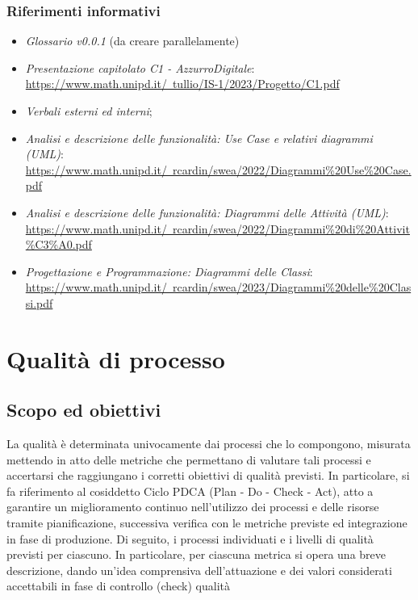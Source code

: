 \documentclass[10pt, a4paper]{article}
\begin{document}
    \subsubsection{Riferimenti informativi}
    
    \begin{itemize}
    \item \textit{Glossario v0.0.1} (da creare parallelamente) 
    \item \textit{Presentazione capitolato C1 - AzzurroDigitale}:\\
    \href{https://www.math.unipd.it/~tullio/IS-1/2023/Progetto/C1.pdf}{https://www.math.unipd.it/~tullio/IS-1/2023/Progetto/C1.pdf}
    \item \textit{Verbali esterni ed interni};
    \item \textit{Analisi e descrizione delle funzionalità: Use Case e relativi diagrammi (UML)}:\\
    \href{https://www.math.unipd.it/~rcardin/swea/2022/Diagrammi%20Use%20Case.pdf}{https://www.math.unipd.it/~rcardin/swea/2022/Diagrammi\%20Use\%20Case.pdf}
    \item \textit{Analisi e descrizione delle funzionalità: Diagrammi delle Attività (UML)}:\\
    \href{https://www.math.unipd.it/~rcardin/swea/2022/Diagrammi%20di%20Attivit%C3%A0.pdf}{https://www.math.unipd.it/~rcardin/swea/2022/Diagrammi\%20di\%20Attivit\%C3\%A0.pdf}
    \item \textit{Progettazione e Programmazione: Diagrammi delle Classi}:\\
    \href{https://www.math.unipd.it/~rcardin/swea/2023/Diagrammi%20delle%20Classi.pdf}{https://www.math.unipd.it/~rcardin/swea/2023/Diagrammi\%20delle\%20Classi.pdf}
    \end{itemize}

\newpage
\section{Qualità di processo}
\subsection{Scopo ed obiettivi}
La qualità è determinata univocamente dai processi che lo compongono, misurata mettendo in atto 
delle metriche che permettano di valutare tali processi e accertarsi che raggiungano i corretti 
obiettivi di qualità previsti. In particolare, si fa riferimento al cosiddetto Ciclo PDCA (Plan - Do - Check 
- Act), atto a garantire un miglioramento continuo nell’utilizzo dei processi e delle risorse tramite 
pianificazione, successiva verifica con le metriche previste ed integrazione in fase di produzione. Di 
seguito, i processi individuati e i livelli di qualità previsti per ciascuno.
In particolare, per ciascuna metrica si opera una breve descrizione, dando un’idea comprensiva 
dell’attuazione e dei valori considerati accettabili in fase di controllo (check) qualità
\end{document}
